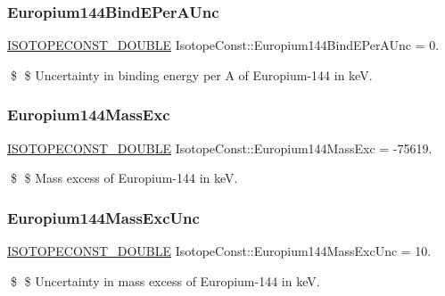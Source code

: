 \subsubsection{\texorpdfstring{Europium144\+Bind\+E\+Per\+A\+Unc}{Europium144BindEPerAUnc}}
{\footnotesize\ttfamily \mbox{\hyperlink{group___isotope_const-_macros_ga8f45a7272ce02c0b4c65c44636ed719a}{I\+S\+O\+T\+O\+P\+E\+C\+O\+N\+S\+T\+\_\+\+D\+O\+U\+B\+LE}} Isotope\+Const\+::\+Europium144\+Bind\+E\+Per\+A\+Unc = 0.}

\$ \$ Uncertainty in binding energy per A of Europium-\/144 in keV. \mbox{\label{group___isotope_const-_europium-_eu144_gaa15b38116e9fccb3b44d8105784d4016}} 
\subsubsection{\texorpdfstring{Europium144\+Mass\+Exc}{Europium144MassExc}}
{\footnotesize\ttfamily \mbox{\hyperlink{group___isotope_const-_macros_ga8f45a7272ce02c0b4c65c44636ed719a}{I\+S\+O\+T\+O\+P\+E\+C\+O\+N\+S\+T\+\_\+\+D\+O\+U\+B\+LE}} Isotope\+Const\+::\+Europium144\+Mass\+Exc = -\/75619.}

\$ \$ Mass excess of Europium-\/144 in keV. \mbox{\label{group___isotope_const-_europium-_eu144_gaa1d18d030765949477a5becdcdcd69db}} 
\subsubsection{\texorpdfstring{Europium144\+Mass\+Exc\+Unc}{Europium144MassExcUnc}}
{\footnotesize\ttfamily \mbox{\hyperlink{group___isotope_const-_macros_ga8f45a7272ce02c0b4c65c44636ed719a}{I\+S\+O\+T\+O\+P\+E\+C\+O\+N\+S\+T\+\_\+\+D\+O\+U\+B\+LE}} Isotope\+Const\+::\+Europium144\+Mass\+Exc\+Unc = 10.}

\$ \$ Uncertainty in mass excess of Europium-\/144 in keV. \mbox{\label{group___isotope_const-_europium-_eu144_ga193c437cf8fb2d6a3e3e584725fbf545}} 

